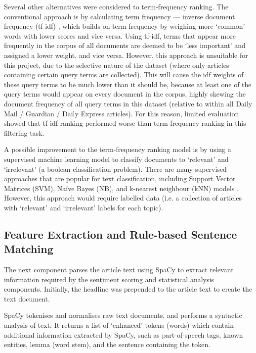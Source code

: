 \documentclass{report}
\begin{document}
Several other alternatives were considered to term-frequency ranking.
The conventional approach is by calculating term frequency --- inverse document frequency (tf-idf) \cite{robertson2004understanding, sparck1972statistical}, which builds on term frequency by weighing more `common' words with lower scores and vice versa.
Using tf-idf, terms that appear more frequently in the corpus of all documents are deemed to be `less important' and assigned a lower weight, and vice versa.
However, this approach is unsuitable for this project, due to the selective nature of the dataset (where only articles containing certain query terms are collected). 
This will cause the idf weights of these query terms to be much lower than it should be, because at least one of the query terms would appear on every document in the corpus, highly skewing the document frequency of all query terms in this dataset (relative to within all Daily Mail / Guardian / Daily Express articles).
For this reason, limited evaluation showed that tf-idf ranking performed worse than term-frequency ranking in this filtering task.

A possible improvement to the term-frequency ranking model is by using a supervised machine learning model to classify documents to `relevant' and `irrelevant' (a boolean classification problem).
There are many supervised approaches that are popular for text classification, including Support Vector Matrices (SVM), Na\"{i}ve Bayes (NB), and k-nearest neighbour (kNN) models \cite{khan2010review}.
However, this approach would require labelled data (i.e. a collection of articles with `relevant' and `irrelevant' labels for each topic).

\subsection{Feature Extraction and Rule-based Sentence Matching} \label{des-matching}

The next component parses the article text using SpaCy \cite{SpaCy} to extract relevant information required by the sentiment scoring and statistical analysis components.
Initially, the headline was prepended to the article text to create the text document.

SpaCy tokenises and normalises raw text documents, and performs a syntactic analysis of text. 
It returns a list of `enhanced' tokens (words) which contain additional information extracted by SpaCy, such as part-of-speech tags, known entities, lemma (word stem), and the sentence containing the token.
\end{document}
